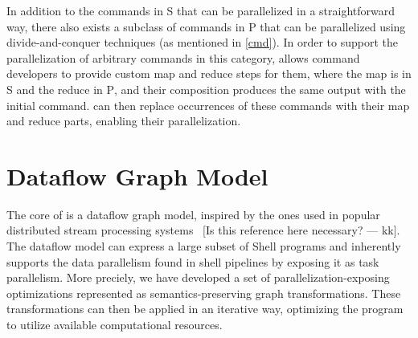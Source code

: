 \documentclass[letterpaper,twocolumn,10pt]{article}
\newcommand{\cn}[1]{\mbox{\textcircled{\footnotesize #1}}}
\newcommand{\pur}{\cn{\textsc{P}}\xspace}
\newcommand{\sta}{\cn{\textsc{S}}\xspace}
\newcommand{\nv}[1]{[{\color{cyan}#1 --- nv}]}
\newcommand{\kk}[1]{[{\color{magenta}#1 --- kk}]}
\newcommand{\tr}[1]{} %
\begin{document}
%
\noindent
In addition to the commands in \sta that can be parallelized in a
straightforward way, there also exists a subclass of commands in \pur
that can be parallelized using divide-and-conquer techniques (as
mentioned in \cref{cmd}). In order to support the parallelization of
arbitrary commands in this category, \sys allows command developers to
provide custom map and reduce steps for them, where the map
is in \sta and the reduce in \pur, and their composition produces the
same output with the initial command. \sys can then replace occurrences
of these commands with their map and reduce parts, enabling their
parallelization.


\tr{\kk{I am not sure a general interface is so easy to design. It needs
  more though. It might be beneficial to just talk about sort and wc
  here and how we implemented them and nothing more. Or maybe this
  could then go to the implementation? Or maybe say that one can write
  a python function that given a node of the graph, transforms it into
  many. I am not sure what is best...}}


\tr{Can we find a solution for the commands in coreutils?}


\section{Dataflow Graph Model}
\label{ir}

The core of \sys is a dataflow graph model, inspired by the ones used
in popular distributed stream processing systems~ \kk{Is
  this reference here necessary?}. The dataflow model can express a
large subset of Shell programs and inherently supports the data
parallelism found in shell pipelines by exposing it as task
parallelism. More preciely, we have developed a set of
parallelization-exposing optimizations represented as
semantics-preserving graph transformations. These transformations can
then be applied in an iterative way, optimizing the program to utilize
available computational resources.

\end{document}
